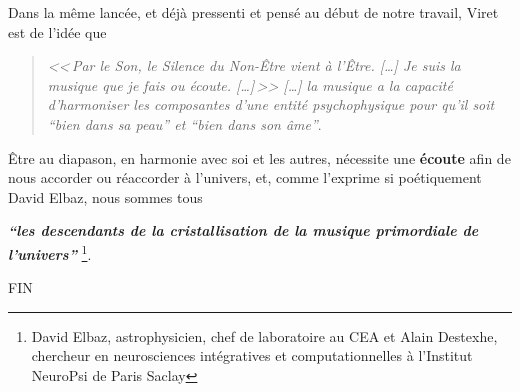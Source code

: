  




 


Dans la même lancée, et déjà pressenti et  pensé au début de notre travail, Viret
est de l'idée que\label{jeSuisLaMusique:viret}
\begin{quotation}
\emph{<<\,\emph{Par le Son, le Silence du Non-Être vient à l'Être}. [\dots] 
\textsl{Je suis}
	\emph{la musique que je fais ou écoute}. [\dots]\,>>
[\ldots] \emph{la musique a la capacité d'harmoniser
les composantes d'une entité psychophysique pour qu'il soit ``bien
dans sa peau'' et ``bien dans son âme}''}.\, \autocite[ch. 1, p.8]{viret:b}
\end{quotation}
Être au diapason, en harmonie avec soi et les autres,
nécessite une\textbf{ écoute } afin de nous accorder ou réaccorder à
l'univers, et, comme l'exprime si poétiquement David Elbaz, nous
sommes tous


\textit{\textbf{``les descendants de la  cristallisation de la musique primordiale de
l'univers''}} \autocite{delbaz_recherche_2016} \footnote{David Elbaz, astrophysicien, chef de laboratoire au CEA et Alain
Destexhe, chercheur en neurosciences intégratives et computationnelles
à l'Institut  NeuroPsi de Paris Saclay}.



\begin{center}
  FIN
\end{center}











